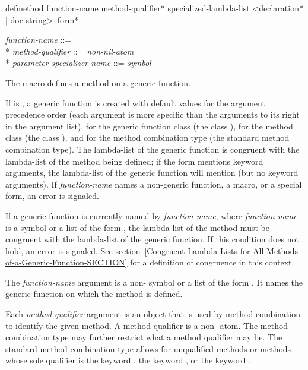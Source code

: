 \begin{defmac}
defmethod function-name {method-qualifier}*
          specialized-lambda-list
          <{declaration}* | doc-string> {\,form}*

\begin{tabbing}
\emph{function-name\/} ::=  \\*
\emph{method-qualifier\/} ::= \emph{non-nil-atom} \\*
\emph{parameter-specializer-name\/} ::= \emph{symbol} {\Mor} 
\end{tabbing}
The macro  defines a method on a generic function.  

If  is , a generic
function is created with default values for the argument precedence
order (each argument is more specific than the arguments to its right
in the argument list), for the generic function class (the class 
), for the method class (the class 
), and for the method combination type (the standard
method combination type).  The lambda-list of the generic function is
congruent with the lambda-list of the method being defined; if the
 form mentions keyword arguments, the lambda-list of
the generic function will mention  (but no keyword
arguments).  If \emph{function-name\/} names a non-generic
function, a macro, or a special form, an error is signaled.

If a generic function is currently named by {\it
function-name\/}, where \emph{function-name\/} is a symbol or
a list of the form , the lambda-list of the
method must be congruent with the lambda-list of the generic function.
If this condition does not hold, an error is signaled.  See
section~\ref{Congruent-Lambda-Lists-for-All-Methods-of-a-Generic-Function-SECTION}
for a definition of congruence in this context.




The \emph{function-name\/} argument is a non- symbol or a
list of the form .  It names the generic
function on which the method is defined.

Each \emph{method-qualifier\/} argument is an object that is used by
method combination to identify the given method.  A method qualifier
is a non- atom.  The method combination type may further
restrict what a method qualifier may be.  The standard method
combination type allows for unqualified methods or methods whose sole
qualifier is the keyword , the keyword 
, or the keyword .


\end{defmac}
